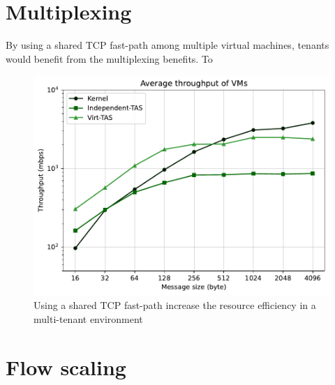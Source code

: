 \section{Multiplexing}
By using a shared TCP fast-path among multiple virtual machines, tenants would benefit from the 
multiplexing benefits. To 

\begin{figure}
    \centering
    \includegraphics[scale=0.8]{../results/multiplex.throughput.pdf}
    \caption{Using a shared TCP fast-path increase the resource efficiency in  a multi-tenant environment}
    \label{fig:multiplex.throughput}
\end{figure}



\section{Flow scaling}
